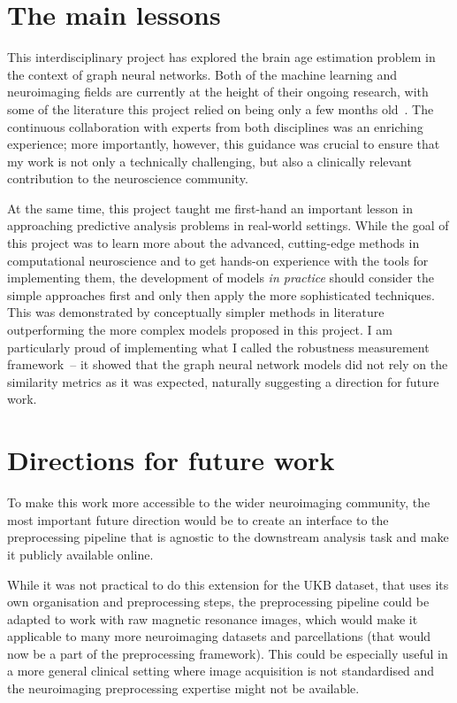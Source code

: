 \section{The main lessons}
This interdisciplinary project has explored the brain age estimation problem in the context of graph neural networks. Both of the machine learning and neuroimaging fields are currently at the height of their ongoing research, with some of the literature this project relied on being only a few months old~\cite{kaufmann2019, niu2019improved, pervaiz2020optimising}. The continuous collaboration with experts from both disciplines was an enriching experience; more importantly, however, this guidance was crucial to ensure that my work is not only a technically challenging, but also a clinically relevant contribution to the neuroscience community.

At the same time, this project taught me first-hand an important lesson in approaching predictive analysis problems in real-world settings. While the goal of this project was to learn more about the advanced, cutting-edge methods in computational neuroscience and to get hands-on experience with the tools for implementing them, the development of models \textit{in practice} should consider the simple approaches first and only then apply the more sophisticated techniques. This was demonstrated by conceptually simpler methods in literature outperforming the more complex models proposed in this project. I am particularly proud of implementing what I called the robustness measurement framework~– it showed that the graph neural network models did not rely on the similarity metrics as it was expected, naturally suggesting a direction for future work.

\section{Directions for future work}
To make this work more accessible to the wider neuroimaging community, the most important future direction would be to create an interface to the preprocessing pipeline that is agnostic to the downstream analysis task and make it publicly available online. 

While it was not practical to do this extension for the UKB dataset, that uses its own organisation and preprocessing steps, the preprocessing pipeline could be adapted to work with raw magnetic resonance images, which would make it applicable to many more neuroimaging datasets and parcellations (that would now be a part of the preprocessing framework). This could be especially useful in a more general clinical setting where image acquisition is not standardised and the neuroimaging preprocessing expertise might not be available.

